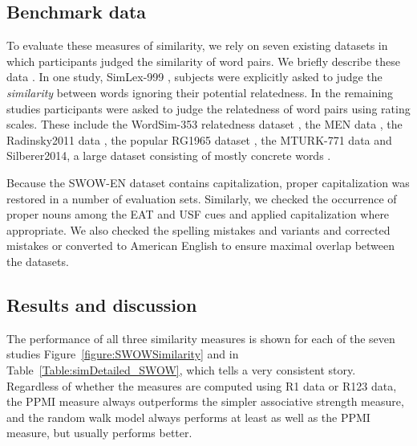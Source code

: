 \documentclass[a4paper,doc,natbib,floatsintext]{apa6}
\begin{document}
\subsection{Benchmark data}

To evaluate these measures of similarity, we rely on seven existing datasets in which participants judged the similarity of word pairs. We briefly describe these data \citep[see also][]{DeDeyne2016ACL}. In one study, SimLex-999 \citep{Hill2016simlex}, subjects were explicitly asked to judge the {\it similarity} between words ignoring their potential relatedness. In the remaining studies participants were asked to judge the relatedness of word pairs using rating scales. These include the WordSim-353 relatedness dataset \citep{AgirreAlfonseca2009}, the MEN data \citep{BruniBoleda2012}, the Radinsky2011 data \citep{RadinskyAgichtein2011}, the popular RG1965 dataset \citep{Rubenstein1965}, the MTURK-771 data \citep{HalawiDror2012} and Silberer2014, a large dataset consisting of mostly concrete words \citep{Silberer2014}.

Because the SWOW-EN dataset contains capitalization, proper capitalization was restored in a number of evaluation sets. Similarly, we checked the occurrence of proper nouns among the EAT and USF cues and applied capitalization where appropriate. We also checked the spelling mistakes and variants and corrected mistakes or converted to American English to ensure maximal overlap between the datasets.


\subsection{Results and discussion}
The performance of all three similarity measures is shown for each of the seven studies Figure~\ref{figure:SWOWSimilarity} and in Table~\ref{Table:simDetailed_SWOW}, which tells a very consistent story. Regardless of whether the measures are computed using R1 data or R123 data, the PPMI measure always outperforms the simpler associative strength measure, and the random walk model always performs at least as well as the PPMI measure, but usually performs better.
\end{document}
